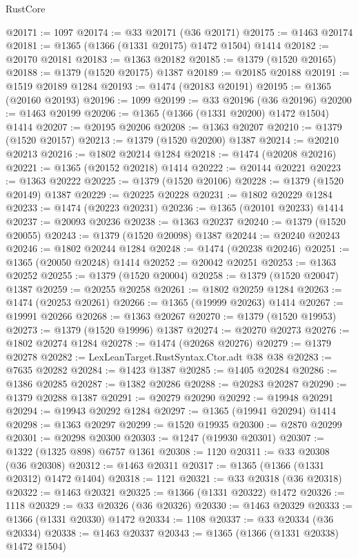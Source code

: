 \begin{lexlean}{RustCore}
\begin{coremodule}
@20171 := 1097
@20174 := @33 @20171 (@36 @20171)
@20175 := @1463 @20174
@20181 := @1365 (@1366 (@1331 @20175) @1472 @1504) @1414
@20182 := @20170 @20181
@20183 := @1363 @20182
@20185 := @1379 (@1520 @20165)
@20188 := @1379 (@1520 @20175) @1387
@20189 := @20185 @20188
@20191 := @1519 @20189 @1284
@20193 := @1474 (@20183 @20191)
@20195 := @1365 (@20160 @20193)
@20196 := 1099
@20199 := @33 @20196 (@36 @20196)
@20200 := @1463 @20199
@20206 := @1365 (@1366 (@1331 @20200) @1472 @1504) @1414
@20207 := @20195 @20206
@20208 := @1363 @20207
@20210 := @1379 (@1520 @20157)
@20213 := @1379 (@1520 @20200) @1387
@20214 := @20210 @20213
@20216 := @1802 @20214 @1284
@20218 := @1474 (@20208 @20216)
@20221 := @1365 (@20152 @20218) @1414
@20222 := @20144 @20221
@20223 := @1363 @20222
@20225 := @1379 (@1520 @20106)
@20228 := @1379 (@1520 @20149) @1387
@20229 := @20225 @20228
@20231 := @1802 @20229 @1284
@20233 := @1474 (@20223 @20231)
@20236 := @1365 (@20101 @20233) @1414
@20237 := @20093 @20236
@20238 := @1363 @20237
@20240 := @1379 (@1520 @20055)
@20243 := @1379 (@1520 @20098) @1387
@20244 := @20240 @20243
@20246 := @1802 @20244 @1284
@20248 := @1474 (@20238 @20246)
@20251 := @1365 (@20050 @20248) @1414
@20252 := @20042 @20251
@20253 := @1363 @20252
@20255 := @1379 (@1520 @20004)
@20258 := @1379 (@1520 @20047) @1387
@20259 := @20255 @20258
@20261 := @1802 @20259 @1284
@20263 := @1474 (@20253 @20261)
@20266 := @1365 (@19999 @20263) @1414
@20267 := @19991 @20266
@20268 := @1363 @20267
@20270 := @1379 (@1520 @19953)
@20273 := @1379 (@1520 @19996) @1387
@20274 := @20270 @20273
@20276 := @1802 @20274 @1284
@20278 := @1474 (@20268 @20276)
@20279 := @1379 @20278
@20282 := LexLeanTarget.RustSyntax.Ctor.adt @38 @38
@20283 := @7635 @20282
@20284 := @1423 @1387
@20285 := @1405 @20284
@20286 := @1386 @20285
@20287 := @1382 @20286
@20288 := @20283 @20287
@20290 := @1379 @20288 @1387
@20291 := @20279 @20290
@20292 := @19948 @20291
@20294 := @19943 @20292 @1284
@20297 := @1365 (@19941 @20294) @1414
@20298 := @1363 @20297
@20299 := @1520 @19935
@20300 := @2870 @20299
@20301 := @20298 @20300
@20303 := @1247 (@19930 @20301)
@20307 := @1322 (@1325 @898) @6757 @1361
@20308 := 1120
@20311 := @33 @20308 (@36 @20308)
@20312 := @1463 @20311
@20317 := @1365 (@1366 (@1331 @20312) @1472 @1404)
@20318 := 1121
@20321 := @33 @20318 (@36 @20318)
@20322 := @1463 @20321
@20325 := @1366 (@1331 @20322) @1472
@20326 := 1118
@20329 := @33 @20326 (@36 @20326)
@20330 := @1463 @20329
@20333 := @1366 (@1331 @20330) @1472
@20334 := 1108
@20337 := @33 @20334 (@36 @20334)
@20338 := @1463 @20337
@20343 := @1365 (@1366 (@1331 @20338) @1472 @1504)

\end{coremodule}
\end{lexlean}
